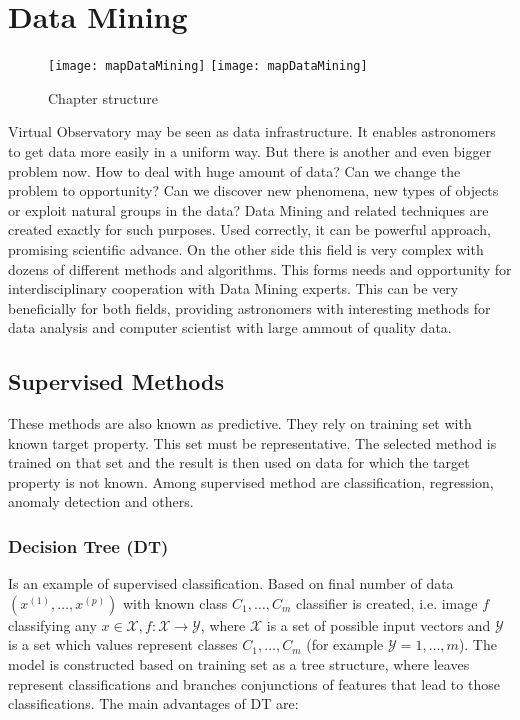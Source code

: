 \chapter{Data Mining}

\begin{figure}[!htbp]
  \begin{center}
    \leavevmode
    \ifpdf
    \texttt{[image: mapDataMining]}
    \else
    \texttt{[image: mapDataMining]}
    \fi
    \caption{Chapter structure}
    \label{FigStructure}
  \end{center}
\end{figure}

\label{chap:dataMining}
Virtual Observatory may be seen as data infrastructure. It enables
astronomers to get data more easily in a uniform way. But there is
another and even bigger problem now. How to deal with huge amount of
data? Can we change the problem to opportunity? Can we discover new
phenomena, new types of objects or exploit natural groups in the data?
Data Mining and related techniques are created exactly for such
purposes. Used correctly, it can be powerful approach, promising
scientific advance. On the other side this field is very complex with
dozens of different methods and algorithms. This forms needs and
opportunity for interdisciplinary cooperation with Data Mining
experts. This can be very beneficially for both fields, providing
astronomers with interesting methods for data analysis and computer
scientist with large ammout of quality data.

\section{Supervised Methods}
These methods are also known as predictive\cite{ball2010data}. They
rely on training set with known target property. This set must be
representative. The selected method is trained on that set and the
result is then used on data for which the target property is not
known. Among supervised method are classification, regression, anomaly
detection and others.

\subsection{Decision Tree (DT)}
Is an example of supervised classification. Based on final number of
data $(x^{(1)},\ldots,x^{(p)})$ with known class $C_1,\ldots, C_m$
classifier is created, i.e. image $f$ classifying any $x \in
\mathcal{X}, f:\mathcal{X}\rightarrow \mathcal{Y}$, where
$\mathcal{X}$ is a set of possible input vectors and $\mathcal{Y}$ is
a set which values represent classes $C_1,\ldots, C_m$ (for example
$\mathcal{Y} = {1,\ldots,m}$). The model is constructed based on
training set as a tree structure, where leaves represent
classifications and branches conjunctions of features that lead to
those classifications. The main advantages of DT are:

